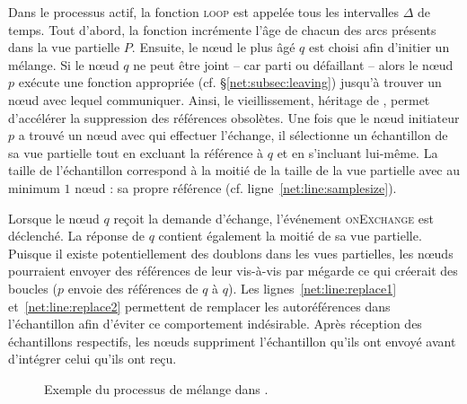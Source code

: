 Dans le processus actif, la fonction \textsc{loop} est appelée tous les
intervalles $\Delta$ de temps. Tout d'abord, la fonction incrémente l'âge de
chacun des arcs présents dans la vue partielle $P$. Ensuite, le nœud le plus âgé
$q$ est choisi afin d'initier un mélange. Si le nœud $q$ ne peut être joint --
car parti ou défaillant -- alors le nœud $p$ exécute une fonction appropriée
(cf.  §\ref{net:subsec:leaving}) jusqu'à trouver un nœud avec lequel
communiquer. Ainsi, le vieillissement, héritage de \CYCLON, permet
d'accélérer la suppression des références obsolètes. Une fois que le nœud
initiateur $p$ a trouvé un nœud avec qui effectuer l'échange, il sélectionne un
échantillon de sa vue partielle tout en excluant la référence à $q$ et en
s'incluant lui-même. La taille de l'échantillon correspond à la moitié de la
taille de la vue partielle avec au minimum $1$ nœud : sa propre référence
(cf. ligne~\ref{net:line:samplesize}).


Lorsque le nœud $q$ reçoit la demande d'échange, l'événement \textsc{onExchange}
est déclenché. La réponse de $q$ contient également la moitié de sa vue
partielle. Puisque il existe potentiellement des doublons dans les vues
partielles, les nœuds pourraient envoyer des références de leur vis-à-vis par
mégarde ce qui créerait des boucles ($p$ envoie des références de $q$ à
$q$). Les lignes~\ref{net:line:replace1} et~\ref{net:line:replace2} permettent de
remplacer les autoréférences dans l'échantillon afin d'éviter ce comportement
indésirable. Après réception des échantillons respectifs, les nœuds suppriment
l'échantillon qu'ils ont envoyé avant d'intégrer celui qu'ils ont reçu.

\begin{figure*}
  \centering
  \hspace{40pt}
  \hspace{10pt}
  \caption[Processus de mélange périodique dans \SPRAY]
  {\label{net:fig:cyclicexample}Exemple du processus de mélange dans \SPRAY.}
\end{figure*}

